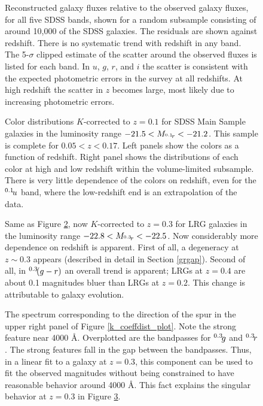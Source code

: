 \clearpage
{}
\begin{figure}
\figurenum{\fignum}
\caption{\label{k_model_plot} Reconstructed galaxy fluxes relative to
the observed galaxy fluxes, for all five SDSS bands, shown for a
random subsample consisting of around 10,000 of the SDSS galaxies. The
residuals are shown against redshift.  There is no systematic trend
with redshift in any band. The 5-$\sigma$ clipped estimate of the
scatter around the observed fluxes is listed for each band. In $u$,
$g$, $r$, and $i$ the scatter is consistent with the expected
photometric errors in the survey at all redshifts. At high redshift
the scatter in $z$ becomes large, most likely due to increasing
photometric errors. }
\end{figure}

\clearpage
{}
\begin{figure}
\figurenum{\fignum}
\caption{\label{main_colors_plot} Color distributions $K$-corrected to
$z=0.1$ for SDSS Main Sample galaxies in the luminosity range
$-21.5<M_{^{{0.1}}\!{r}}<-21.2$. This sample is complete for
$0.05<z<0.17$. Left panels show the colors as a function of
redshift. Right panel shows the distributions of each color at high
and low redshift within the volume-limited subsample. There is very
little dependence of the colors on redshift, even for the
$^{{0.1}}\!{u}$ band, where the low-redshift end is an extrapolation
of the data.}
\end{figure}

\clearpage
{}
\begin{figure}
\figurenum{\fignum}
\caption{\label{lrg_colors_plot} Same as Figure
\ref{main_colors_plot}, now $K$-corrected to $z=0.3$ for LRG galaxies
in the luminosity range $-22.8<M_{^{{0.3}}\!{r}}<-22.5$. Now
considerably more dependence on redshift is apparent. First of all, a
degeneracy at $z\sim 0.3$ appears (described in detail in Section
\ref{grgap}). Second of all, in $^{{0.3}}\!{(g-r)}$ an overall trend
is apparent; LRGs at $z=0.4$ are about 0.1 magnitudes bluer than LRGs
at $z=0.2$. This change is attributable to galaxy evolution.}
\end{figure}

\clearpage
{}
\begin{figure}
\figurenum{\fignum}
\caption{\label{spur} The spectrum corresponding to the direction of
the spur in the upper right panel of Figure
\ref{k_coeffdist_plot}. Note the strong feature near 4000
\AA. Overplotted are the bandpasses for $^{{0.3}}\!{g}$ and
$^{{0.3}}\!{r}$. The strong features fall in the gap between the
bandpasses. Thus, in a linear fit to a galaxy at $z=0.3$, this
component can be used to fit the observed magnitudes without being
constrained to have reasonable behavior around 4000 \AA. This fact
explains the singular behavior at $z=0.3$ in Figure
\ref{lrg_colors_plot}.}
\end{figure}

